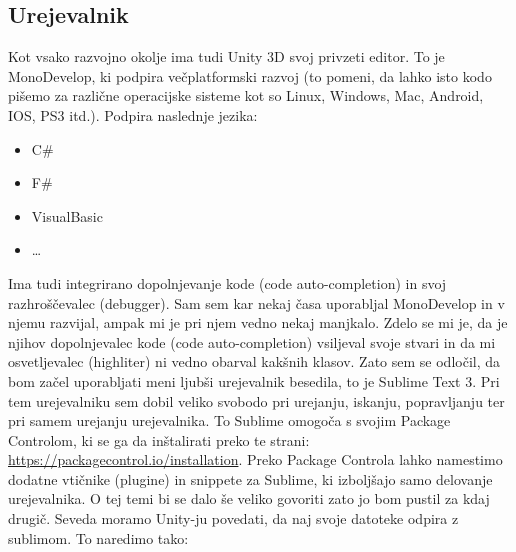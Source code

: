 {\color{indiagreen}\subsection{Urejevalnik}}
Kot vsako razvojno okolje ima tudi Unity 3D svoj privzeti editor. To je MonoDevelop, ki podpira večplatformski razvoj (to pomeni, da lahko isto kodo pišemo za različne operacijske sisteme kot so Linux, Windows, Mac, Android, IOS, PS3 itd.). Podpira naslednje jezika: \\
\begin{itemize}
	\item C\# \cite{GameDevThorn}
	\item F\#
	\item VisualBasic
	\item \dots
\end{itemize}
Ima tudi integrirano dopolnjevanje kode (code auto-completion) in svoj razhroščevalec (debugger). Sam sem kar nekaj časa uporabljal MonoDevelop in v njemu razvijal, ampak mi je pri njem vedno nekaj manjkalo. Zdelo se mi je, da je njihov dopolnjevalec kode (code auto-completion) vsiljeval svoje stvari in da mi osvetljevalec (highliter) ni vedno obarval kakšnih klasov. Zato sem se odločil, da bom začel uporabljati meni ljubši urejevalnik besedila, to je Sublime Text 3. Pri tem urejevalniku sem dobil veliko svobodo pri urejanju, iskanju, popravljanju ter pri samem urejanju urejevalnika. To Sublime omogoča s svojim Package Controlom, ki se ga da inštalirati preko te strani: \url{https://packagecontrol.io/installation}. Preko Package Controla lahko namestimo dodatne vtičnike (plugine) in snippete za Sublime, ki izboljšajo samo delovanje urejevalnika. O tej temi bi se dalo še veliko govoriti zato jo bom pustil za kdaj drugič. Seveda moramo Unity-ju povedati, da naj svoje datoteke odpira z sublimom. To naredimo tako:\\
